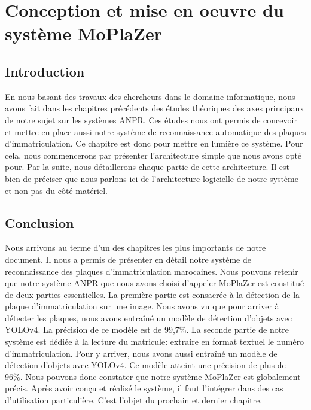 \chapter{\textbf{Conception et mise en oeuvre du système MoPlaZer}}
    \section{Introduction}
    En nous basant des travaux des chercheurs dans le domaine informatique, nous avons fait dans les chapitres précédents des études théoriques des axes principaux de notre sujet sur les systèmes ANPR. Ces études nous ont permis de concevoir et mettre en place aussi notre système de reconnaissance automatique des plaques d'immatriculation. Ce chapitre est donc pour mettre en lumière ce système. Pour cela, nous commencerons par présenter l'architecture simple que nous avons opté pour. Par la suite, nous détaillerons chaque partie de cette architecture. Il est bien de préciser que nous parlons ici de l'architecture logicielle de notre système et non pas du côté matériel.
    
    
    
    

    \section{Conclusion}
    Nous arrivons au terme d’un des chapitres les plus importants de notre document. Il  nous a permis de présenter en détail notre système de reconnaissance des plaques d’immatriculation marocaines. Nous pouvons retenir que notre système ANPR que nous avons choisi d’appeler MoPlaZer est constitué de deux parties essentielles. La première partie est consacrée à la détection de la plaque d’immatriculation sur une image. Nous avons vu que pour arriver à détecter les plaques, nous avons entraîné un modèle de détection d’objets avec YOLOv4. La précision de ce modèle est de 99,7\%. La seconde partie de notre système est dédiée à la lecture du matricule: extraire en format textuel le numéro d’immatriculation. Pour y arriver, nous avons aussi entraîné un modèle de détection d’objets avec YOLOv4. Ce modèle atteint une précision de plus de 96\%. Nous pouvons donc constater que notre système MoPlaZer est globalement précis. Après avoir conçu et réalisé le système, il faut l’intégrer dans des cas d’utilisation particulière. C’est l’objet du prochain et dernier chapitre.
